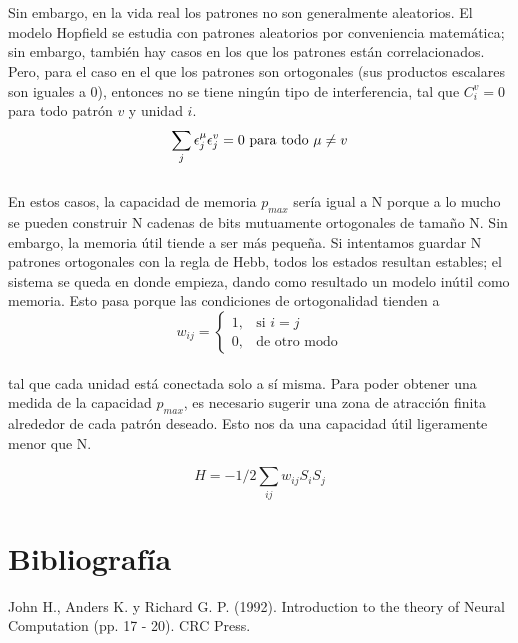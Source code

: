 \documentclass{article}
\begin{document}
\\\\
Sin embargo, en la vida real los patrones no son generalmente aleatorios. El modelo Hopfield se estudia con patrones aleatorios por conveniencia matemática; sin embargo, también hay casos en los que los patrones están correlacionados. Pero, para el caso en el que los patrones son ortogonales (sus productos escalares son iguales a 0), entonces no se tiene ningún tipo de interferencia, tal que $C_i^v = 0$ para todo patrón $v$ y unidad $i$.
\begin{equation}
    \sum_j\epsilon_j^\mu\epsilon_j^v = 0 \text{ para todo   } \mu \neq v\\
    \label{eq:condición P_{error}3}
\end{equation}
\\
En estos casos, la capacidad de memoria $p_{max}$ sería igual a N porque a lo mucho se pueden construir N cadenas de bits mutuamente ortogonales de tamaño N. Sin embargo, la memoria útil tiende a ser más pequeña. Si intentamos guardar N patrones ortogonales con la regla de Hebb, todos los estados resultan estables; el sistema se queda en donde empieza, dando como resultado un modelo inútil como memoria. Esto pasa porque las condiciones de ortogonalidad tienden a
\begin{equation}
    w_{ij} =
    \begin{cases}
        1, & \text{si } i = j \\
        0, & \text{de otro modo}
    \end{cases}
    \label{eq. wij}
\end{equation}
\\
tal que cada unidad está conectada solo a sí misma. Para poder obtener una medida de la capacidad $p_{max}$, es necesario sugerir una zona de atracción finita alrededor de cada patrón deseado. Esto nos da una capacidad útil ligeramente menor que N.

\begin{equation}
    H = -1/2 \sum_{ij} w_{ij} S_iS_j 
    \label{eq. wij}
\end{equation}
\section{Bibliografía}
\begin{thebibliography}{9}

 John H., Anders K. y Richard G. P. (1992). Introduction to the theory of Neural
Computation (pp. 17 - 20). CRC Press.


\end{thebibliography}
\end{document}
